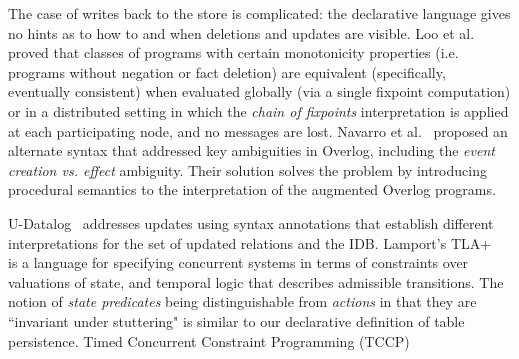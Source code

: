 The case of writes back to the store is complicated: the declarative language gives no hints as to how to and when deletions and updates
are visible.  Loo et al.~\cite{loo-sigmod06} proved that classes of programs with certain monotonicity properties (i.e. programs without negation or fact deletion)
are equivalent (specifically, eventually consistent) when evaluated globally (via a single fixpoint computation) or in a distributed setting in which the 
\emph{chain of fixpoints} interpretation is applied at each participating node, and no messages are lost.
Navarro et al.~\cite{navarro} proposed an alternate syntax that addressed key ambiguities in Overlog, including the
\emph{event creation vs. effect} ambiguity.  Their solution solves the problem by introducing procedural semantics to the interpretation of 
the augmented Overlog programs.


U-Datalog~\cite{udatalog-neg} addresses updates using syntax annotations that establish different interpretations for the set of updated 
relations and the IDB.  Lamport's TLA+~\cite{tla} is a language for specifying concurrent systems in terms of constraints over valuations of
state, and temporal logic that describes admissible transitions.  The notion of \emph{state predicates} being distinguishable from \emph{actions}
in that they are ``invariant under stuttering" is similar to our declarative definition of table persistence.  Timed Concurrent Constraint Programming
(TCCP)~\cite{tccp, tdccp} 